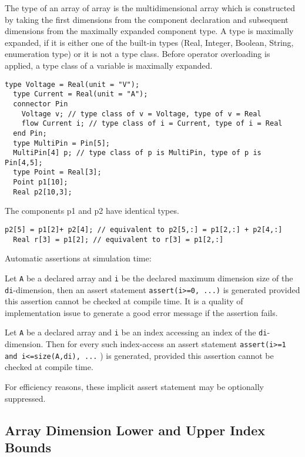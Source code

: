 The type of an array of array is the multidimensional array which is
constructed by taking the first dimensions from the component
declaration and subsequent dimensions from the maximally expanded
component type. A type is maximally expanded, if it is either one of the
built-in types (Real, Integer, Boolean, String, enumeration type) or it
is not a type class. Before operator overloading is applied, a type
class of a variable is maximally expanded.

\begin{example}
\begin{lstlisting}[language=modelica]
  type Voltage = Real(unit = "V");
  type Current = Real(unit = "A");
  connector Pin
    Voltage v; // type class of v = Voltage, type of v = Real
    flow Current i; // type class of i = Current, type of i = Real
  end Pin;
  type MultiPin = Pin[5];
  MultiPin[4] p; // type class of p is MultiPin, type of p is Pin[4,5];
  type Point = Real[3];
  Point p1[10];
  Real p2[10,3];
\end{lstlisting}
The components p1 and p2 have identical types.
\begin{lstlisting}[language=modelica]
  p2[5] = p1[2]+ p2[4]; // equivalent to p2[5,:] = p1[2,:] + p2[4,:]
  Real r[3] = p1[2]; // equivalent to r[3] = p1[2,:]
\end{lstlisting}
\end{example}

\begin{nonnormative}
Automatic assertions at simulation time:

Let \lstinline!A! be a declared array and \lstinline!i! be the declared maximum dimension
size of the \lstinline!di!-dimension, then an assert statement
\lstinline!assert(i>=0, ...)! is generated provided this
assertion cannot be checked at compile time. It is a quality of
implementation issue to generate a good error message if the assertion
fails.

Let \lstinline!A! be a declared array and \lstinline!i! be an index accessing an index of
the \lstinline!di!-dimension. Then for every such index-access an assert
statement \lstinline!assert(i>=1 and i<=size(A,di), ...!
) is generated, provided this assertion cannot be checked at
compile time.

For efficiency reasons, these implicit assert statement may be optionally suppressed.
\end{nonnormative}

\subsection{Array Dimension Lower and Upper Index Bounds}

